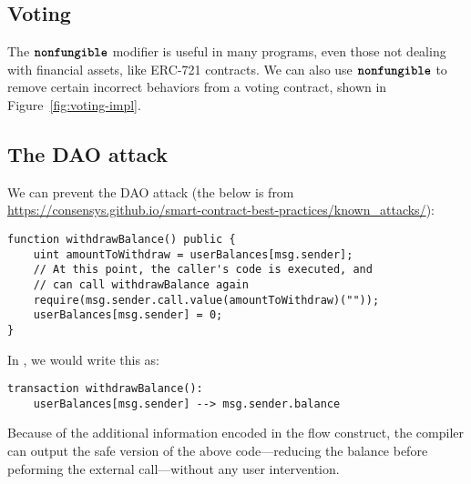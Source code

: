 \documentclass[sigconf]{acmart}
\begin{document}
\subsection{Voting}
\begin{figure*}[h]
    \centering
    \begin{minipage}[t]{0.5\textwidth}
        
    \end{minipage}%
    \begin{minipage}[t]{0.5\textwidth}
        
    \end{minipage}
    \caption{A Solidity and a \langName implementation of a simple voting contract.}
    \label{fig:voting-impl}
\end{figure*}

The $\textbf{\texttt{nonfungible}}$ modifier is useful in many programs, even those not dealing with financial assets, like ERC-721 contracts.
We can also use $\textbf{\texttt{nonfungible}}$ to remove certain incorrect behaviors from a voting contract, shown in Figure~\ref{fig:voting-impl}.

\subsection{The DAO attack}
We can prevent the DAO attack (the below is from \url{https://consensys.github.io/smart-contract-best-practices/known_attacks/}):
\begin{lstlisting}
function withdrawBalance() public {
    uint amountToWithdraw = userBalances[msg.sender];
    // At this point, the caller's code is executed, and
    // can call withdrawBalance again
    require(msg.sender.call.value(amountToWithdraw)(""));
    userBalances[msg.sender] = 0;
}
\end{lstlisting}

In \langName, we would write this as:

\begin{lstlisting}
transaction withdrawBalance():
    userBalances[msg.sender] --> msg.sender.balance
\end{lstlisting}

Because of the additional information encoded in the flow construct, the compiler can output the safe version of the above code---reducing the balance before peforming the external call---without any user intervention.
\end{document}
